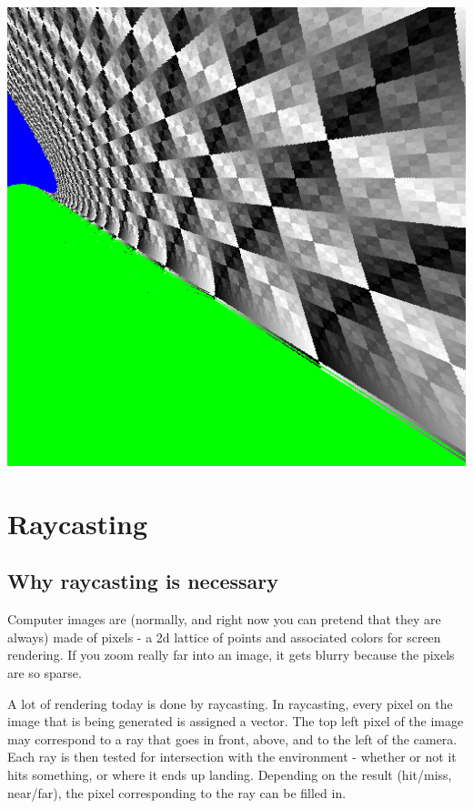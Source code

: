 




\includegraphics[width=\columnwidth]{sqrt.png}

\section*{Raycasting}

\subsection*{Why raycasting is necessary}

Computer images are (normally, and right now you can pretend that they are always) made of pixels - a 2d lattice of points and associated colors for screen rendering.  If you zoom really far into an image, it gets blurry because the pixels are so sparse.

A lot of rendering today is done by raycasting.  In raycasting, every pixel on the image that is being generated is assigned a vector.  The top left pixel of the image may correspond to a ray that goes in front, above, and to the left of the camera.  Each ray is then tested for intersection with the environment - whether or not it hits something, or where it ends up landing.  Depending on the result (hit/miss, near/far), the pixel corresponding to the ray can be filled in.

